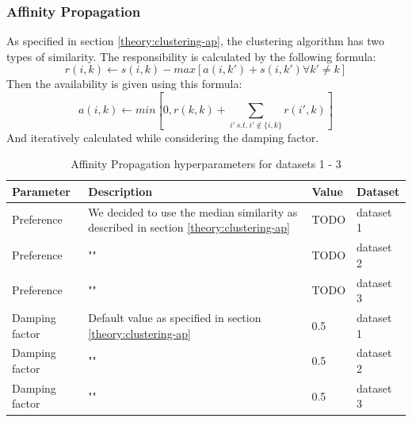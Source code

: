 \subsubsection{Affinity Propagation}
As specified in section \ref{theory:clustering-ap}, the clustering algorithm has two types of similarity.
The responsibility is calculated by the following formula:
\begin{equation}
  r(i, k) \leftarrow s(i, k) - max [ a(i, k') + s(i, k') \forall k' \neq k ]
\end{equation}
Then the availability is given using this formula:
\begin{equation}
  a(i, k) \leftarrow min [0, r(k, k) + \sum_{i'~s.t.~i' \notin \{i, k\}}{r(i', k)}]
\end{equation}
And iteratively calculated while considering the damping factor.
\begin{table}[h]
  \begin{tabular}{|l|p{6cm}|l|l|}
    \hline
    Parameter      & Description                                                                                & Value & Dataset   \\
    \hline
    Preference     & We decided to use the median similarity as described in section \ref{theory:clustering-ap} & TODO  & dataset 1 \\
    \hline
    Preference     & ""                                                                                         & TODO  & dataset 2 \\
    \hline
    Preference     & ""                                                                                         & TODO  & dataset 3 \\
    \hline
    Damping factor & Default value as specified in section \ref{theory:clustering-ap}                           & 0.5   & dataset 1 \\
    \hline
    Damping factor & ""                                                                                         & 0.5   & dataset 2 \\
    \hline
    Damping factor & ""                                                                                         & 0.5   & dataset 3 \\
    \hline
  \end{tabular}
  \caption{Affinity Propagation hyperparameters for datasets 1 - 3}
  \label{tab:ap-formula-sklearn}
\end{table}
